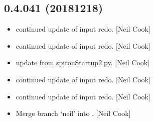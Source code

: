 \documentclass[a4paper,10pt,english]{report}
\begin{document}
\subsection{0.4.041 (2018\sphinxhyphen{}12\sphinxhyphen{}18)}
\label{\detokenize{misc/changelog:id245}}\begin{itemize}
\item {} 
 \sphinxhyphen{} continued update of input redo. {[}Neil Cook{]}

\item {} 
 \sphinxhyphen{} continued update of input redo. {[}Neil Cook{]}

\item {} 
 \sphinxhyphen{} update from spirouStartup2.py. {[}Neil Cook{]}

\item {} 
 \sphinxhyphen{} continued update of input redo. {[}Neil Cook{]}

\item {} 
 \sphinxhyphen{} continued update of input redo. {[}Neil Cook{]}

\item {} 
Merge branch ‘neil’ into . {[}Neil Cook{]}

\end{itemize}
\end{document}
